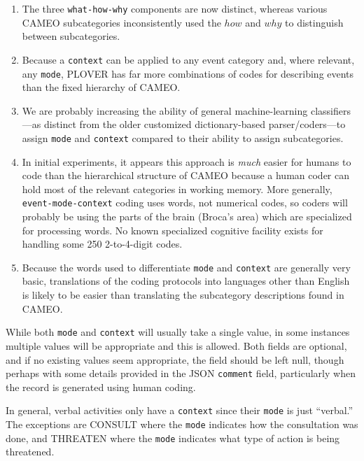 \documentclass[11pt]{report}
\newcommand{\plcat}[1]{\textsf{#1}}
\newcommand{\txt}[1]{\texttt{#1}}
\begin{document}
\begin{enumerate}

\item The three \texttt{what-how-why} components are now distinct, whereas various CAMEO subcategories inconsistently used the $how$ and $why$ to distinguish between subcategories.

\item Because a \txt{context} can be applied to any event category and, where relevant, any \txt{mode}, PLOVER has far more combinations of codes for describing events than the fixed hierarchy of CAMEO.

\item We are probably increasing the ability of general machine-learning classifiers---as distinct from the older customized dictionary-based parser/coders---to assign \txt{mode} and \txt{context} compared to their ability to assign subcategories.

\item In initial experiments, it appears this  approach is \textit{much} easier for humans to code than the hierarchical structure of CAMEO because a human coder can hold most of the relevant categories in working memory. More generally,  \txt{event-mode-context}  coding uses words, not numerical codes, so coders will probably be using the parts of the brain (Broca's area) which are specialized for processing words. No known specialized cognitive facility exists for handling some 250 2-to-4-digit codes.

\item Because the words used to differentiate \txt{mode} and \txt{context} are generally very basic, translations of the coding protocols into languages other than English is likely to be easier than translating the subcategory descriptions found in CAMEO.
\end{enumerate}

While both \txt{mode} and \txt{context} will usually take a single value, in some instances multiple values will be appropriate and this is allowed. Both fields are optional, and if no existing values seem appropriate, the field should be left null, though perhaps with some details provided in the JSON \texttt{comment} field, particularly when the record is generated using human coding.

In general, verbal activities only have a \txt{context} since their \txt{mode} is just ``verbal.'' The exceptions are \plcat{CONSULT} where the \texttt{mode} indicates how the consultation was done, and \plcat{THREATEN} where the \texttt{mode} indicates what type of action is being threatened.
\end{document}
